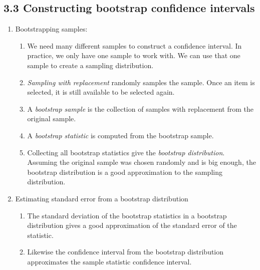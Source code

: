 \documentclass{article}
\begin{document}
\subsection{3.3 Constructing bootstrap confidence intervals}
\begin{enumerate}

\item Bootstrapping samples:
\begin{enumerate}
\item We need many different samples to construct a confidence interval. In practice, we only have one sample to work with. We can use that one sample to create a sampling distribution.
\item \emph{Sampling with replacement} randomly samples the sample. Once an item is selected, it is still available to be selected again.
\item A \emph{bootstrap sample} is the collection of samples with replacement from the original sample.
\item A \emph{bootstrap statistic} is computed from the bootstrap sample. 
\item Collecting all bootstrap statistics give the \emph{bootstrap distribution}. Assuming the original sample was chosen randomly and is big enough, the bootstrap distribution is a good approximation to the sampling distribution.
\end{enumerate}

\item Estimating standard error from a bootstrap distribution
\begin{enumerate}
\item The standard deviation of the bootstrap statistics in a bootstrap distribution gives a good approximation of the standard error of the statistic.
\item Likewise the confidence interval from the bootstrap distribution approximates the sample statistic confidence interval.
\end{enumerate}

\end{enumerate}

\end{document}
